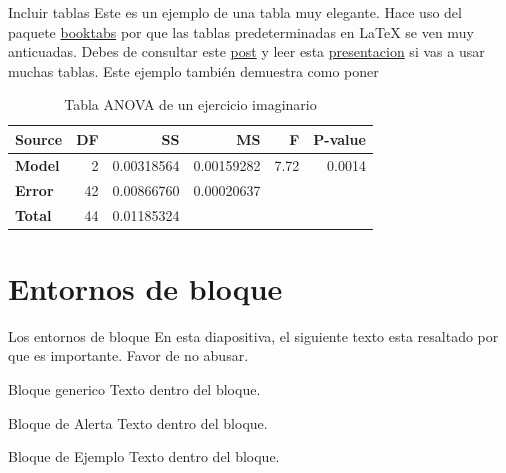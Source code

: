 \begin{frame}{Incluir tablas}
Este es un ejemplo de una tabla muy elegante.
Hace uso del paquete \href{https://ctan.org/pkg/booktabs}{booktabs} por que las tablas predeterminadas en \LaTeX{} se ven muy anticuadas.
Debes de consultar este \href{https://jdhao.github.io/2019/08/27/latex_table_with_booktabs/}{post} y leer esta \href{https://people.inf.ethz.ch/markusp/teaching/guides/guide-tables.pdf}{presentacion} si vas a usar muchas tablas.
Este ejemplo también demuestra como poner 
\begin{table}[htb]
  \begin{center}
    \begin{tabular}{l | r r r r r}
      \toprule
      Source & \textbf{DF} & \textbf{SS} & \textbf{MS} & \textbf{F} & \textbf{P-value} \\
      \midrule
      \textbf{Model} & 2 & 0.00318564 & 0.00159282 & 7.72 & 0.0014 \\
      \textbf{Error} & 42 & 0.00866760 & 0.00020637 &  & \\
      \midrule
      \textbf{Total} & 44 & 0.01185324 &   &  & \\
      \bottomrule
    \end{tabular}
  \end{center}
\caption{Tabla ANOVA de un ejercicio imaginario}
\end{table}
\end{frame}

\section{Entornos de bloque}
\begin{frame}{Los entornos de bloque}
En esta diapositiva, el siguiente texto esta
\alert{resaltado} por que es importante.
Favor de no abusar.
    \begin{block}{Bloque generico}
        Texto dentro del bloque.
    \end{block}

    \begin{alertblock}{Bloque de Alerta}
        Texto dentro del bloque.
    \end{alertblock}

    \begin{exampleblock}{Bloque de Ejemplo}
        Texto dentro del bloque.
    \end{exampleblock}   
\end{frame}

